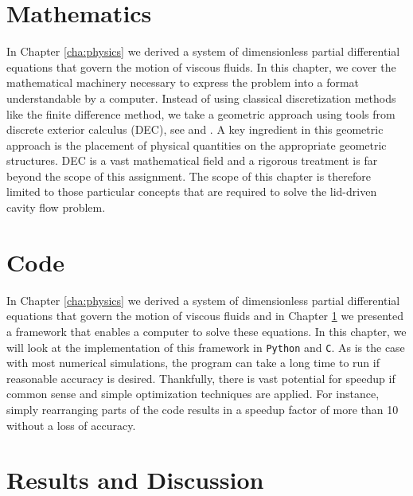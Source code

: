 \documentclass[a4paper, 11pt, toc=bibliography, parskip=half]{scrreprt}
\begin{document}



\chapter{Mathematics}
\label{cha:mathematics}

In Chapter \ref{cha:physics} we derived a system of dimensionless partial differential equations that govern the motion of viscous fluids. In this chapter, we cover the mathematical machinery necessary to express the problem into a format understandable by a computer. Instead of using classical discretization methods like the finite difference method, we take a geometric approach using tools from discrete exterior calculus (DEC), see \parencite{frankel2012geometry} and \parencite{hirani2003discrete}. A key ingredient in this geometric approach is the placement of physical quantities on the appropriate geometric structures. DEC is a vast mathematical field and a rigorous treatment is far beyond the scope of this assignment. The scope of this chapter is therefore limited to those particular concepts that are required to solve the lid-driven cavity flow problem.







\chapter{Code}
\label{cha:code}

In Chapter \ref{cha:physics} we derived a system of dimensionless partial differential equations that govern the motion of viscous fluids and in Chapter \ref{cha:mathematics} we presented a framework that enables a computer to solve these equations. In this chapter, we will look at the implementation of this framework in \texttt{Python} and \texttt{C}. As is the case with most numerical simulations, the program can take a long time to run if reasonable accuracy is desired. Thankfully, there is vast potential for speedup if common sense and simple optimization techniques are applied. For instance, simply rearranging parts of the code results in a speedup factor of more than 10 without a loss of accuracy.





\chapter{Results and Discussion}
\label{cha:results}
\end{document}
